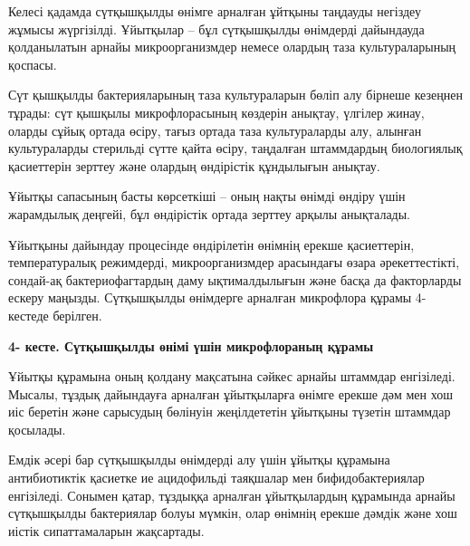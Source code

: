 {Келесі қадамда сүтқышқылды өнімге арналған ұйтқыны таңдауды негіздеу
жұмысы жүргізілді. Ұйытқылар -- бұл сүтқышқылды өнімдерді дайындауда
қолданылатын арнайы микроорганизмдер немесе олардың таза культураларының
қоспасы.

Сүт қышқылды бактерияларының таза культураларын бөліп алу бірнеше
кезеңнен тұрады: сүт қышқылы микрофлорасының көздерін анықтау, үлгілер
жинау, оларды сұйық ортада өсіру, тағыз ортада таза культураларды алу,
алынған культураларды стерильді сүтте қайта өсіру, таңдалған штаммдардың
биологиялық қасиеттерін зерттеу және олардың өндірістік құндылығын
анықтау.

Ұйытқы сапасының басты көрсеткіші -- оның нақты өнімді өндіру үшін
жарамдылық деңгейі, бұл өндірістік ортада зерттеу арқылы анықталады.

Ұйытқыны дайындау процесінде өндірілетін өнімнің ерекше қасиеттерін,
температуралық режимдерді, микроорганизмдер арасындағы өзара
әрекеттестікті, сондай-ақ бактериофагтардың даму ықтималдылығын және
басқа да факторларды ескеру маңызды. Сүтқышқылды өнімдерге арналған
микрофлора құрамы 4-кестеде берілген.

{\bfseries 4- кесте. Сүтқышқылды өнімі үшін микрофлораның құрамы}


Ұйытқы құрамына оның қолдану мақсатына сәйкес арнайы штаммдар
енгізіледі. Мысалы, тұздық дайындауға арналған ұйытқыларға өнімге ерекше
дәм мен хош иіс беретін және сарысудың бөлінуін жеңілдететін ұйытқыны
түзетін штаммдар қосылады.

Емдік әсері бар сүтқышқылды өнімдерді алу үшін ұйытқы құрамына
антибиотиктік қасиетке ие ацидофильді таяқшалар мен бифидобактериялар
енгізіледі. Сонымен қатар, тұздыққа арналған ұйытқылардың құрамында
арнайы сүтқышқылды бактериялар болуы мүмкін, олар өнімнің ерекше дәмдік
және хош иістік сипаттамаларын жақсартады.

}
